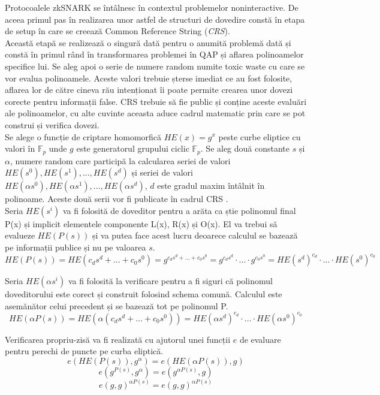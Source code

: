 Protocoalele zkSNARK se întâlnesc în contextul problemelor noninteractive. De aceea primul pas în realizarea unor astfel de structuri de dovedire constă în etapa de setup în care se creează Common Reference String (\textit{CRS}).\\

Această etapă se realizează o singură dată pentru o anumită problemă dată și constă în primul rând în  transformarea problemei în QAP și aflarea polinoamelor specifice lui. Se aleg apoi o serie de numere random numite toxic waste cu care se vor evalua polinoamele. Aceste valori trebuie șterse imediat ce au fost folosite, aflarea lor de către cineva rău intenționat îi poate permite crearea unor dovezi corecte pentru informații false. CRS trebuie să fie public și conține aceste evaluări ale polinoamelor, cu alte cuvinte aceasta aduce cadrul matematic prin care se pot construi și verifica dovezi.\\

Se alege o funcție de criptare homomorfică $HE(x) = g^x$ peste curbe eliptice cu valori în $\mathbb{F}_p$ unde $g$ este generatorul grupului ciclic $\mathbb{F}_p$. Se aleg două constante $s$ și $\alpha$, numere random care participă la calcularea seriei de valori $HE(s^0),HE(s^1),...,HE(s^d)$ și seriei de valori $HE(\alpha s^0),HE(\alpha s^1),...,HE(\alpha s^d)$, $d$ este gradul maxim întâlnit în polinoame. Aceste două serii vor fi publicate în cadrul CRS \cite{ZKS_Crypto_Basic3}.\\

Seria $HE(s^i)$ va fi folosită de doveditor pentru a arăta ca știe polinomul final P(x) și implicit elementele componente L(x), R(x) și O(x). El va trebui să evalueze $HE(P(s))$ și va putea face acest lucru deoarece calculul se bazează pe informații publice și nu pe valoarea $s$.
\[ HE(P(s)) = HE(c_ds^d + ... + c_0s^0) = g^{c_ds^d + ... + c_0s^0} = g^{c_ds^d} \cdot ... \cdot g^{c_0s^0} = HE(s^d)^{c_d} \cdot ... \cdot HE(s^0)^{c_0} \]

Seria $HE(\alpha s^i)$ va fi folosită la verificare pentru a fi siguri că polinomul doveditorului este corect și construit folosind schema comună. Calculul este asemănător celui precedent și se bazează tot pe polinomul P.
\[ HE(\alpha P(s)) = HE(\alpha (c_ds^d + ... + c_0s^0)) = HE(\alpha s^d)^{c_d} \cdot ... \cdot HE(\alpha s^0)^{c_0} \]

Verificarea propriu-zisă va fi realizată cu ajutorul unei funcții $e$ de evaluare pentru perechi de puncte pe curba eliptică.
\[ e(HE(P(s)), g^{\alpha}) = e(HE(\alpha P(s)), g) \]
\[ e(g^{P(s)}, g^{\alpha}) = e(g^{\alpha P(s)}, g) \]
\[ e(g,g)^{\alpha P(s)} = e(g,g)^{\alpha P(s)} \]

